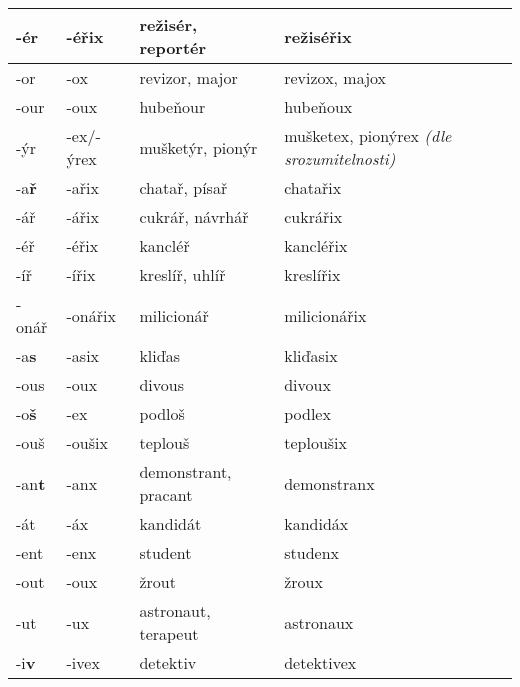 \begin{table}
{\begin{longtabu}{|X[1,R]|X[1,R]|X[3,L]|X[3,L]|}
-ér             &-éřix  &režisér, reportér  &režiséřix\\\hline%
-or             &-ox    &revizor, major     &revizox, majox\\\hline%
-our            &-oux   &hubeňour           &hubeňoux\\\hline%
-ýr             &-ex/-ýrex&mušketýr, pionýr &mušketex, pionýrex {\footnotesize\emph{(dle srozumitelnosti)}}\\\hline%
%
-a\textbf{ř}    &-ařix  &chatař, písař      &chatařix\\\hline%
-ář             &-ářix  &cukrář, návrhář    &cukrářix\\\hline%
-éř             &-éřix  &kancléř            &kancléřix\\\hline%
-íř             &-ířix  &kreslíř, uhlíř     &kreslířix\\\hline%
-onář           &-onářix&milicionář         &milicionářix\\\hline%
%
-a\textbf{s}    &-asix  &kliďas             &kliďasix\\\hline%
-ous            &-oux   &divous             &divoux\\\hline%
%
-o\textbf{š}    &-ex    &podloš             &podlex\\\hline%
-ouš            &-oušix &teplouš            &teploušix\\\hline%
%
-an\textbf{t}   &-anx   &demonstrant, pracant   &demonstranx\\\hline%
-át             &-áx    &kandidát           &kandidáx\\\hline%
-ent            &-enx   &student            &studenx\\\hline%
-out            &-oux   &žrout              &žroux\\\hline%
-ut             &-ux    &astronaut, terapeut&astronaux\\\hline%
%
-i\textbf{v}    &-ivex  &detektiv&detektivex\\\hline%

\end{longtabu}}
\end{table}
